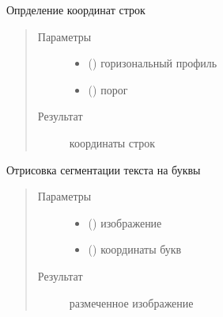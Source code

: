 \documentclass[letterpaper,10pt,russian]{sphinxmanual}
\begin{document}
\begin{fulllineitems}
\label{\detokenize{TextProfiler:TextProfiler.get_rows_in_text}}
Опрделение координат строк
\begin{quote}\begin{description}
\item[{Параметры}] \leavevmode\begin{itemize}
\item {} 
 () \textendash{} горизональный профиль

\item {} 
 () \textendash{} порог

\end{itemize}

\item[{Результат}] \leavevmode
{} \textendash{} координаты строк

\end{description}\end{quote}

\end{fulllineitems}


\begin{fulllineitems}
\label{\detokenize{TextProfiler:TextProfiler.draw_segmented_row}}
Отрисовка сегментации текста на буквы
\begin{quote}\begin{description}
\item[{Параметры}] \leavevmode\begin{itemize}
\item {} 
 () \textendash{} изображение

\item {} 
 () \textendash{} координаты букв

\end{itemize}

\item[{Результат}] \leavevmode
{} \sphinxhyphen{} размеченное изображение

\end{description}\end{quote}

\end{fulllineitems}
\end{document}
